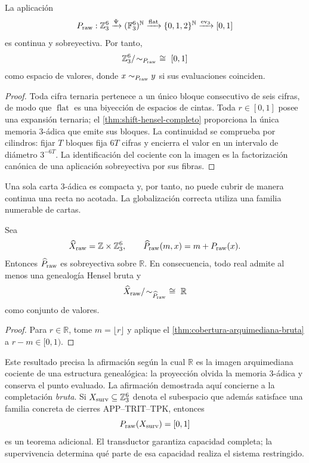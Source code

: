 \begin{theorem}
\label{thm:cobertura-arquimediana-bruta}
La aplicación
\[
 P_{\rm raw}:\mathbb Z_3^6
 \xrightarrow{\Psi}(\mathbb F_3^6)^{\mathbb N}
 \xrightarrow{\operatorname{flat}}\{0,1,2\}^{\mathbb N}
 \xrightarrow{\operatorname{ev}_3}[0,1]
\]
es continua y sobreyectiva. Por tanto,
\[
 \mathbb Z_3^6/\!\sim_{P_{\rm raw}}
 \ \cong\ [0,1]
\]
como espacio de valores, donde \(x\sim_{P_{\rm raw}}y\) si sus evaluaciones
coinciden.
\end{theorem}

\begin{proof}
Toda cifra ternaria pertenece a un único bloque consecutivo de seis cifras,
de modo que \(\operatorname{flat}\) es una biyección de espacios de cintas.
Toda \(r\in[0,1]\) posee una expansión ternaria; el
\cref{thm:shift-hensel-completo} proporciona la única memoria 3-ádica que
emite sus bloques. La continuidad se comprueba por cilindros: fijar \(T\)
bloques fija \(6T\) cifras y encierra el valor en un intervalo de diámetro
\(3^{-6T}\). La identificación del cociente con la imagen es la factorización
canónica de una aplicación sobreyectiva por sus fibras.
\end{proof}

Una sola carta 3-ádica es compacta y, por tanto, no puede cubrir de manera
continua una recta no acotada. La globalización correcta utiliza una familia
numerable de cartas.

\begin{corollary}
\label{cor:atlas-hmt-reales}
Sea
\[
 \widehat X_{\rm raw}=\mathbb Z\times\mathbb Z_3^6,
 \qquad
 \widehat P_{\rm raw}(m,x)=m+P_{\rm raw}(x).
\]
Entonces \(\widehat P_{\rm raw}\) es sobreyectiva sobre \(\mathbb R\).
En consecuencia, todo real admite al menos una genealogía Hensel bruta y
\[
 \widehat X_{\rm raw}/\!\sim_{\widehat P_{\rm raw}}
 \ \cong\ \mathbb R
\]
como conjunto de valores.
\end{corollary}

\begin{proof}
Para \(r\in\mathbb R\), tome \(m=\lfloor r\rfloor\) y aplique el
\cref{thm:cobertura-arquimediana-bruta} a \(r-m\in[0,1)\).
\end{proof}

Este resultado precisa la afirmación según la cual \(\mathbb R\) es la imagen
arquimediana cociente de
una estructura genealógica: la proyección olvida la memoria 3-ádica y conserva
el punto evaluado. La afirmación demostrada aquí concierne a la completación
\emph{bruta}. Si \(X_{\rm surv}\subseteq\mathbb Z_3^6\) denota el subespacio
que además satisface una familia concreta de cierres APP--TRIT--TPK, entonces
\[
 P_{\rm raw}(X_{\rm surv})=[0,1]
\]
es un teorema adicional. El transductor garantiza capacidad completa; la
supervivencia determina qué parte de esa capacidad realiza el sistema
restringido.


